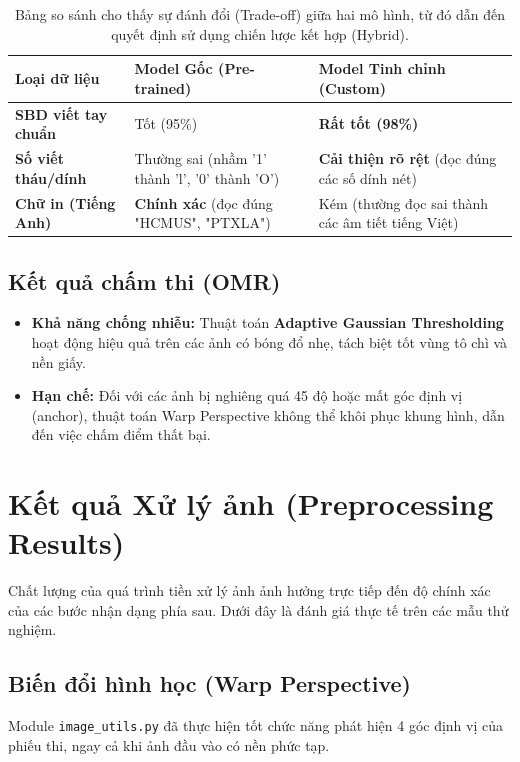 \documentclass[6pt, a4paper]{report}
\begin{document}
	\begin{table}[H]
		\centering
		\begin{tabular}{|l|p{4cm}|p{4cm}|}
			\hline
			\textbf{Loại dữ liệu} & \textbf{Model Gốc (Pre-trained)} & \textbf{Model Tinh chỉnh (Custom)} \\ \hline
			\textbf{SBD viết tay chuẩn} & Tốt (95\%) & \textbf{Rất tốt (98\%)} \\ \hline
			\textbf{Số viết tháu/dính} & Thường sai (nhầm '1' thành 'l', '0' thành 'O') & \textbf{Cải thiện rõ rệt} (đọc đúng các số dính nét) \\ \hline
			\textbf{Chữ in (Tiếng Anh)} & \textbf{Chính xác} (đọc đúng "HCMUS", "PTXLA") & Kém (thường đọc sai thành các âm tiết tiếng Việt) \\ \hline
		\end{tabular}
		\caption{Bảng so sánh cho thấy sự đánh đổi (Trade-off) giữa hai mô hình, từ đó dẫn đến quyết định sử dụng chiến lược kết hợp (Hybrid).}
		\label{tab:ocr_compare}
	\end{table}
	
	\subsection{Kết quả chấm thi (OMR)}
	\begin{itemize}
		\item \textbf{Khả năng chống nhiễu:} Thuật toán \textbf{Adaptive Gaussian Thresholding} hoạt động hiệu quả trên các ảnh có bóng đổ nhẹ, tách biệt tốt vùng tô chì và nền giấy.
		\item \textbf{Hạn chế:} Đối với các ảnh bị nghiêng quá 45 độ hoặc mất góc định vị (anchor), thuật toán Warp Perspective không thể khôi phục khung hình, dẫn đến việc chấm điểm thất bại.
	\end{itemize}
	
	\section{Kết quả Xử lý ảnh (Preprocessing Results)}
	
	Chất lượng của quá trình tiền xử lý ảnh ảnh hưởng trực tiếp đến độ chính xác của các bước nhận dạng phía sau. Dưới đây là đánh giá thực tế trên các mẫu thử nghiệm.
	
	\subsection{Biến đổi hình học (Warp Perspective)}
	Module \texttt{image\_utils.py} đã thực hiện tốt chức năng phát hiện 4 góc định vị của phiếu thi, ngay cả khi ảnh đầu vào có nền phức tạp.
	
\end{document}

